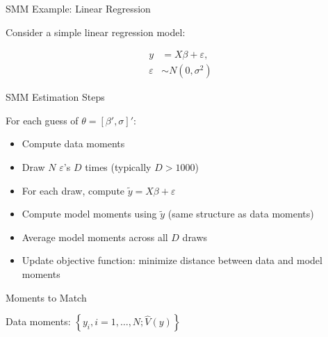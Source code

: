 \documentclass[aspectratio=169]{beamer}
\begin{document}
\begin{frame}

SMM Example: Linear Regression

\bigskip

Consider a simple linear regression model:

\begin{align*}
y &= X\beta + \varepsilon,\\
\varepsilon&\sim N(0,\sigma^2)
\end{align*}

\bigskip


\end{frame}

\begin{frame}

SMM Estimation Steps

\bigskip

For each guess of $\theta = [\beta', \sigma]'$:

\bigskip

\begin{itemize}
\itemsep1.5em
\item<2-> Compute data moments
\item<3-> Draw $N$ $\varepsilon$'s $D$ times (typically $D>1000$)
\item<4-> For each draw, compute $\tilde{y} = X\beta + \varepsilon$
\item<5-> Compute model moments using $\tilde{y}$ (same structure as data moments)
\item<6-> Average model moments across all $D$ draws
\item<7-> Update objective function: minimize distance between data and model moments
\end{itemize}

\end{frame}




\begin{frame}

Moments to Match

\bigskip

Data moments: $\left\{y_i, i=1,\ldots,N;\widehat{V}(y)\right\}$

\bigskip



\end{frame}
\end{document}
